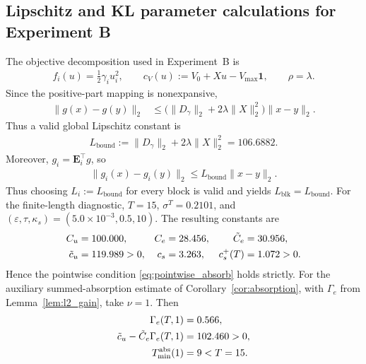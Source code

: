 \documentclass[letterpaper, 10 pt, conference]{ieeeconf} %
\begin{document}
\subsection{Lipschitz and KL parameter calculations for Experiment B}
The objective decomposition used in Experiment~B is
\begin{align}
f_i(u)=\frac{1}{2}\gamma_i u_i^2,
\qquad
c_V(u):=V_0+Xu-V_{\max}\mathbf 1,
\qquad
\rho=\lambda.
\end{align}
Since the positive-part mapping is nonexpansive,
\begin{align}
\|g(x)-g(y)\|_2
&\le
\bigl(\|D_\gamma\|_2+2\lambda\|X\|_2^2\bigr)
\|x-y\|_2 .
\end{align}
Thus a valid global Lipschitz constant is
\begin{align}
L_{\mathrm{bound}}
:=
\|D_\gamma\|_2+2\lambda\|X\|_2^2
=
106.6882.
\end{align}
Moreover, \(g_i=\mathbf E_i^\top g\), so
\begin{align}
\|g_i(x)-g_i(y)\|_2
\le L_{\mathrm{bound}}\|x-y\|_2.
\end{align}
Thus choosing \(L_i:=L_{\mathrm{bound}}\) for every block is valid and yields \(L_{\mathrm{blk}}=L_{\mathrm{bound}}\). For the finite-length diagnostic, \(T=15\), \(\sigma^T=0.2101\), and \((\varepsilon,\tau,\kappa_s)=(5.0\times10^{-3},0.5,10)\). The resulting constants are
\begin{align}
C_u&=100.000,
&
C_e&=28.456,
&
\tilde C_e&=30.956,
\notag\\
\tilde c_u&=119.989>0,
&
c_s&=3.263,
&
c_s^{+}(T)&=1.072>0.
\end{align}
Hence the pointwise condition \eqref{eq:pointwise_absorb} holds strictly. For the auxiliary summed-absorption estimate of Corollary~\ref{cor:absorption}, with \(\Gamma_e\) from Lemma~\ref{lem:l2_gain}, take \(\nu=1\). Then
\begin{align}
\Gamma_e(T,1)&=0.566,
\notag\\
\tilde c_u-\tilde C_e\Gamma_e(T,1)
&=102.460>0,
\notag\\
T_{\min}^{\mathrm{abs}}(1)&=9<T=15.
\end{align}
\end{document}
